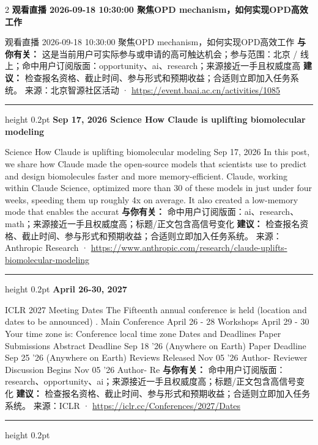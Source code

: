 \documentclass[10.5pt]{ctexart}
\begin{document}
\begin{multicols}{2}
{\large\bfseries 观看直播 2026-09-18 10:30:00 聚焦OPD mechanism，如何实现OPD高效工作}\par
观看直播 2026-09-18 10:30:00 聚焦OPD mechanism，如何实现OPD高效工作
\textbf{与你有关：} 这是当前用户可实际参与或申请的高可触达机会；参与范围：北京 / 线上；命中用户订阅版面：opportunity、ai、research；来源接近一手且权威度高
\textbf{建议：} 检查报名资格、截止时间、参与形式和预期收益；合适则立即加入任务系统。
{\footnotesize\color{ormuted} 来源：北京智源社区活动 · \url{https://event.baai.ac.cn/activities/1085}}
\vspace{2mm}
\hrule height 0.2pt
\vspace{2mm}
{\large\bfseries Sep 17, 2026 Science How Claude is uplifting biomolecular modeling}\par
Science How Claude is uplifting biomolecular modeling Sep 17, 2026 In this post, we share how Claude made the open-source models that scientists use to predict and design biomolecules faster and more memory-efficient. Claude, working within Claude Science, optimized more than 30 of these models in just under four weeks, speeding them up roughly 4x on average. It also created a low-memory mode that enables the accurat
\textbf{与你有关：} 命中用户订阅版面：ai、research、math；来源接近一手且权威度高；标题/正文包含高信号变化
\textbf{建议：} 检查报名资格、截止时间、参与形式和预期收益；合适则立即加入任务系统。
{\footnotesize\color{ormuted} 来源：Anthropic Research · \url{https://www.anthropic.com/research/claude-uplifts-biomolecular-modeling}}
\vspace{2mm}
\hrule height 0.2pt
\vspace{2mm}
{\large\bfseries April 26-30, 2027}\par
ICLR 2027 Meeting Dates The Fifteenth annual conference is held (location and dates to be announced) . Main Conference April 26 - 28 Workshops April 29 - 30 Your time zone is: Conference local time zone Dates and Deadlines Paper Submissions Abstract Deadline Sep 18 '26 (Anywhere on Earth) Paper Deadline Sep 25 '26 (Anywhere on Earth) Reviews Released Nov 05 '26 Author- Reviewer Discussion Begins Nov 05 '26 Author- Re
\textbf{与你有关：} 命中用户订阅版面：research、opportunity、ai；来源接近一手且权威度高；标题/正文包含高信号变化
\textbf{建议：} 检查报名资格、截止时间、参与形式和预期收益；合适则立即加入任务系统。
{\footnotesize\color{ormuted} 来源：ICLR · \url{https://iclr.cc/Conferences/2027/Dates}}
\vspace{2mm}
\hrule height 0.2pt
\vspace{2mm}

\end{multicols}
\end{document}
